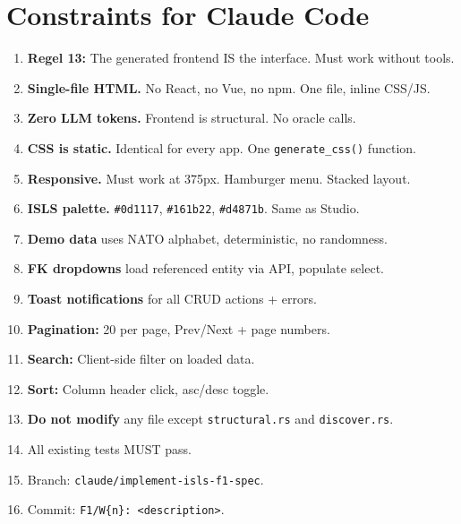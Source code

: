 \documentclass[11pt,a4paper]{article}
\begin{document}
\section{Constraints for Claude Code}
\begin{enumerate}
\item \textbf{Regel 13:} The generated frontend IS the interface. Must work without tools.
\item \textbf{Single-file HTML.} No React, no Vue, no npm. One file, inline CSS/JS.
\item \textbf{Zero LLM tokens.} Frontend is structural. No oracle calls.
\item \textbf{CSS is static.} Identical for every app. One \texttt{generate\_css()} function.
\item \textbf{Responsive.} Must work at 375px. Hamburger menu. Stacked layout.
\item \textbf{ISLS palette.} \texttt{\#0d1117}, \texttt{\#161b22}, \texttt{\#d4871b}. Same as Studio.
\item \textbf{Demo data} uses NATO alphabet, deterministic, no randomness.
\item \textbf{FK dropdowns} load referenced entity via API, populate select.
\item \textbf{Toast notifications} for all CRUD actions + errors.
\item \textbf{Pagination:} 20 per page, Prev/Next + page numbers.
\item \textbf{Search:} Client-side filter on loaded data.
\item \textbf{Sort:} Column header click, asc/desc toggle.
\item \textbf{Do not modify} any file except \texttt{structural.rs} and \texttt{discover.rs}.
\item All existing tests MUST pass.
\item Branch: \texttt{claude/implement-isls-f1-spec}.
\item Commit: \texttt{F1/W\{n\}: <description>}.
\end{enumerate}
\end{document}
